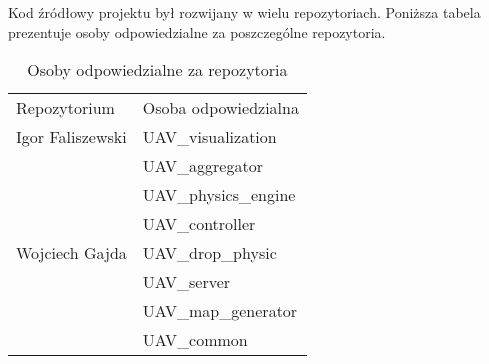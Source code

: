 \newpage
Kod źródłowy projektu był rozwijany w wielu repozytoriach.
Poniższa tabela prezentuje osoby odpowiedzialne za poszczególne repozytoria.

\renewcommand{\arraystretch}{1.1}
\begin{table}[!h]
	\centering
	\begin{tabular}{|m{}|m{}|} 
		\hline
		\rowcolor{Gray}
		Repozytorium &  Osoba odpowiedzialna \\
		\multirow{1}{12em}{Igor Faliszewski} 
		& UAV\_visualization \\
		\hline
		\multirow{7}{12em}{{Wojciech Gajda}} 
		& UAV\_aggregator \\
		& UAV\_physics\_engine\\
		& UAV\_controller \\
		& UAV\_drop\_physic \\
		& UAV\_server \\
		& UAV\_map\_generator \\
		& UAV\_common \\
		\hline
	\end{tabular}
	\caption*{Osoby odpowiedzialne za repozytoria}
\end{table}
